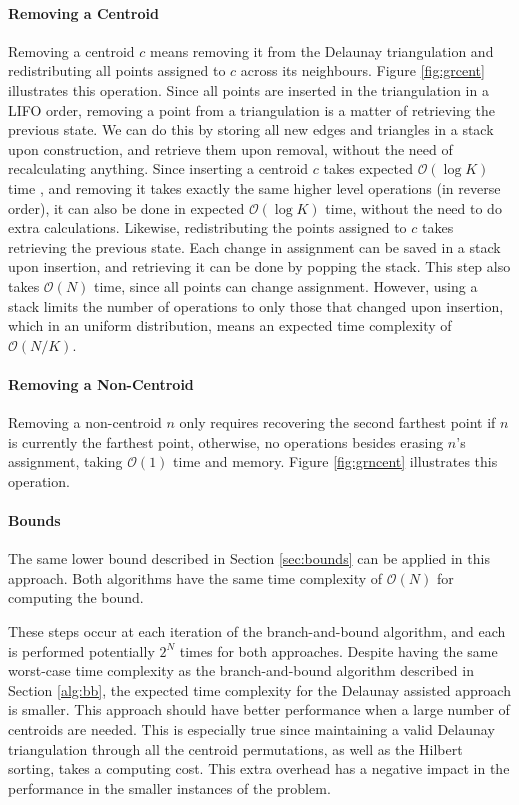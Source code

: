 \paragraph{Removing a Centroid}
Removing a centroid $c$ means removing it from the Delaunay triangulation and redistributing all points assigned to $c$ across its neighbours. Figure \ref{fig:grcent} illustrates this operation.
Since all points are inserted in the triangulation in a LIFO order, removing a point from a triangulation is a matter of retrieving the previous state. We can do this by storing all new edges and triangles in a stack upon construction, and retrieve them upon removal, without the need of recalculating anything. Since inserting a centroid $c$ takes expected $\mathcal{O}(\log{K})$ time \cite{tricomplex}, and removing it takes exactly the same higher level operations (in reverse order), it can also be done in expected $\mathcal{O}(\log{K})$ time, without the need to do extra calculations.
Likewise, redistributing the points assigned to $c$ takes retrieving the previous state. Each change in assignment can be saved in a stack upon insertion, and retrieving it can be done by popping the stack.
This step also takes $\mathcal{O}(N)$ time, since all points can change assignment. However, using a stack limits the number of operations to only those that changed upon insertion, which in an uniform distribution, means an expected time complexity of $\mathcal{O}(N/K)$.



\paragraph{Removing a Non-Centroid}
Removing a non-centroid $n$ only requires recovering the second farthest point if $n$ is currently the farthest point, otherwise, no operations besides erasing $n$'s assignment, taking $\mathcal{O}(1)$ time and memory. Figure \ref{fig:grncent} illustrates this operation.



\paragraph{Bounds}
The same lower bound described in Section \ref{sec:bounds} can be applied in this approach. Both algorithms have the same time complexity of $\mathcal{O}(N)$ for computing the bound.

These steps occur at each iteration of the branch-and-bound algorithm, and each is performed potentially $2^N$ times for both approaches.
Despite having the same worst-case time complexity as the branch-and-bound algorithm described in Section \ref{alg:bb}, the expected time complexity for the Delaunay assisted approach is smaller. This approach should have better performance when a large number of centroids are needed.
This is especially true since maintaining a valid Delaunay triangulation through all the centroid permutations, as well as the Hilbert sorting, takes a computing cost. This extra overhead has a negative impact in the performance in the smaller instances of the problem.
